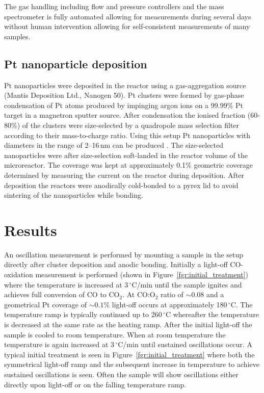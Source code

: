 \documentclass[journal=jacsat,manuscript=article]{achemso}
\begin{document}
The gas handling including flow and pressure controllers and the mass spectrometer is fully automated allowing for measurements during several days without human intervention allowing for self-consistent measurements of many samples.

\subsection{Pt nanoparticle deposition}
Pt nanoparticles were deposited in the reactor using a gas-aggregation source (Mantis Deposition Ltd., Nanogen 50). Pt clusters were formed by gas-phase condensation of Pt atoms produced by impinging argon ions on a 99.99\% Pt target in a magnetron sputter source. After condensation the ionised fraction (60-80\%) of the clusters were size-selected by a quadropole mass selection filter according to their mass-to-charge ratio. Using this setup Pt nanoparticles with diameters in the range of 2--16\,nm can be produced \cite{Nielsen2010,Nielsen2009}. The size-selected nanoparticles were after size-selection soft-landed in the reactor volume of the microreactor. The coverage was kept at approximately 0.1\% geometric coverage determined by measuring the current on the reactor during deposition. After deposition the reactors were anodically cold-bonded \cite{Vesborg2010} to a pyrex lid to avoid sintering of the nanoparticles while bonding.

\section{Results}
An oscillation measurement is performed by mounting a sample in the setup directly after cluster deposition and anodic bonding. Initially a light-off CO-oxidation measurement is performed (shown in Figure~\ref{fgr:initial_treatment}) where the temperature is increased at 3\,$^\circ$C/min until the sample ignites and achieves full conversion of CO to CO$_2$. At CO:O$_2$ ratio of $\sim0.08$ and a geometrical Pt coverage of $\sim0.1\%$ light-off occurs at approximately 180\,$^\circ$C. The temperature ramp is typically continued up to 260\,$^\circ$C whereafter the temperature is decreased at the same rate as the heating ramp. After the initial light-off the sample is cooled to room temperature. When at room temperature the temperature is again increased at 3\,$^\circ$C/min until sustained oscillations occur. A typical initial treatment is seen in Figure~\ref{fgr:initial_treatment} where both the symmetrical light-off ramp and the subsequent increase in temperature to achieve sustained oscillations is seen. Often the sample will show oscillations either directly upon light-off or on the falling temperature ramp.
\end{document}
